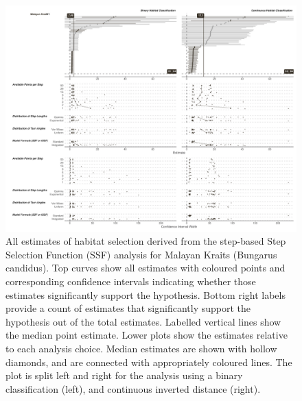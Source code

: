 \documentclass[10pt,a4paper]{article}
\begin{document}
\begin{figure}
\includegraphics[width=1\linewidth]{../../figures/specCurve_Malayan Krait_ssf} \caption{All estimates of habitat selection derived from the step-based Step Selection Function (SSF) analysis for Malayan Kraits (Bungarus candidus). Top curves show all estimates with coloured points and corresponding confidence intervals indicating whether those estimates significantly support the hypothesis. Bottom right labels provide a count of estimates that significantly support the hypothesis out of the total estimates. Labelled vertical lines show the median point estimate. Lower plots show the estimates relative to each analysis choice. Median estimates are shown with hollow diamonds, and are connected with appropriately coloured lines. The plot is split left and right for the analysis using a binary classification (left), and continuous inverted distance (right).}\label{fig:specCurveSsfBUCA}
\end{figure}
\end{document}
